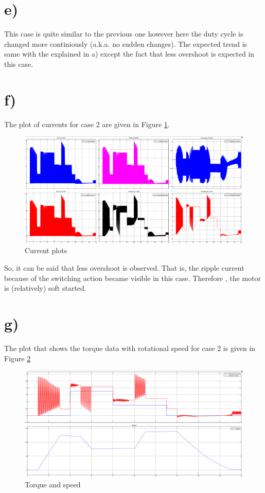 \documentclass[letterpaper,12pt]{article}
\begin{document}
\section{e)}

This case is quite similar to the previous one however here the duty cycle is changed more continiously (a.k.a. no sudden changes). The expected trend is same with the explained in a) except the fact that less overshoot is expected  in this case.
\section{f)}
The plot of currents for case 2 are given in Figure \ref{currents2}.

\begin{figure}[H]
    \centering
    \includegraphics[width=1\textwidth]{case2_1.png}
    \caption{Current plots}
    \label{currents2}
\end{figure} 
So, it can be said that less overshoot is observed. That is, the ripple current because of the switching action became visible in this case. Therefore , the motor is (relatively) soft started.
\section{g)}
The plot that shows the torque data with rotational speed for case 2 is given in Figure \ref{torques2}
\begin{figure}[H]
    \centering
    \includegraphics[width=1\textwidth]{case2_2_torque_speed.png}
    \caption{Torque and speed}
    \label{torques2}
\end{figure} 
\end{document}
